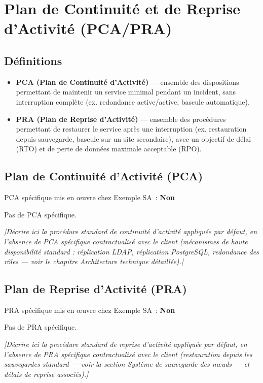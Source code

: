 \documentclass[11pt,a4paper]{report}
\newcommand{\placeholder}[1]{\textit{\textcolor{placeholdercol}{[#1]}}\par\vspace{4pt}}
\begin{document}
\chapter{Plan de Continuité et de Reprise d'Activité (PCA/PRA)}
\label{sec:pca-pra}

\section{Définitions}
\begin{itemize}[nosep]
  \item \textbf{PCA (Plan de Continuité d'Activité)} --- ensemble des dispositions permettant de maintenir un service minimal pendant un incident, sans interruption complète (ex. redondance active/active, bascule automatique).
  \item \textbf{PRA (Plan de Reprise d'Activité)} --- ensemble des procédures permettant de restaurer le service après une interruption (ex. restauration depuis sauvegarde, bascule sur un site secondaire), avec un objectif de délai (RTO) et de perte de données maximale acceptable (RPO).
\end{itemize}

\section{Plan de Continuité d'Activité (PCA)}
PCA spécifique mis en œuvre chez Exemple SA~: \textbf{Non}

Pas de PCA spécifique.

\placeholder{Décrire ici la procédure standard de continuité d'activité appliquée par défaut, en l'absence de PCA spécifique contractualisé avec le client (mécanismes de haute disponibilité standard : réplication LDAP, réplication PostgreSQL, redondance des rôles --- voir le chapitre Architecture technique détaillée).}


\section{Plan de Reprise d'Activité (PRA)}
PRA spécifique mis en œuvre chez Exemple SA~: \textbf{Non}

Pas de PRA spécifique.

\placeholder{Décrire ici la procédure standard de reprise d'activité appliquée par défaut, en l'absence de PRA spécifique contractualisé avec le client (restauration depuis les sauvegardes standard --- voir la section Système de sauvegarde des nœuds --- et délais de reprise associés).}
\end{document}
